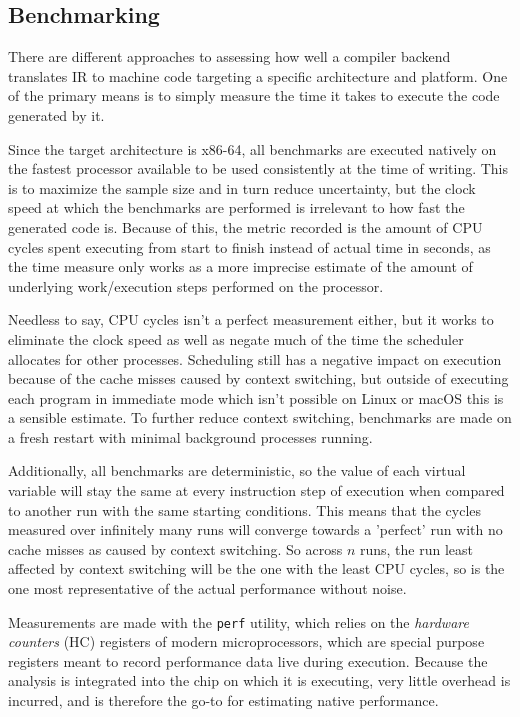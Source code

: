 \documentclass{article}
\begin{document}
\subsection{Benchmarking}


There are different approaches to assessing how well a compiler backend translates IR to machine code targeting a specific architecture and platform. One of the primary means is to simply measure the time it takes to execute the code generated by it.

Since the target architecture is x86-64, all benchmarks are executed natively on the fastest processor available to be used consistently at the time of writing. This is to maximize the sample size and in turn reduce uncertainty, but the clock speed at which the benchmarks are performed is irrelevant to how fast the generated code is. Because of this, the metric recorded is the amount of CPU cycles spent executing from start to finish instead of actual time in seconds, as the time measure only works as a more imprecise estimate of the amount of underlying work/execution steps performed on the processor.

Needless to say, CPU cycles isn't a perfect measurement either, but it works to eliminate the clock speed as well as negate much of the time the scheduler allocates for other processes. Scheduling still has a negative impact on execution because of the cache misses caused by context switching, but outside of executing each program in immediate mode which isn't possible on Linux or macOS this is a sensible estimate. To further reduce context switching, benchmarks are made on a fresh restart with minimal background processes running.

Additionally, all benchmarks are deterministic, so the value of each virtual variable will stay the same at every instruction step of execution when compared to another run with the same starting conditions. %
This means that the cycles measured over infinitely many runs will converge towards a 'perfect' run with no cache misses as caused by context switching. So across \(n\) runs, the run least affected by context switching will be the one with the least CPU cycles, so is the one most representative of the actual performance without noise.

Measurements are made with the \lstinline!perf! utility, which relies on the \textit{hardware counters} (HC) registers of modern microprocessors, which are special purpose registers meant to record performance data live during execution. Because the analysis is integrated into the chip on which it is executing, very little overhead is incurred, and is therefore the go-to for estimating native performance.
\end{document}
